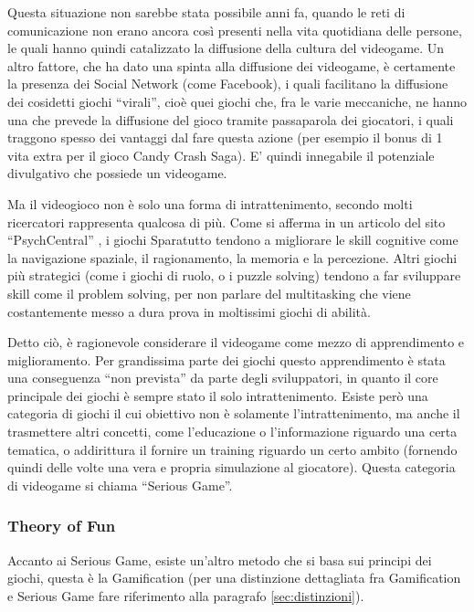 Questa situazione non sarebbe stata possibile anni fa, quando le reti di comunicazione non erano ancora così presenti nella vita quotidiana delle persone, le quali hanno quindi catalizzato la diffusione della cultura del videogame. Un altro fattore, che ha dato una spinta alla diffusione dei videogame, è certamente la presenza dei Social Network (come Facebook), i quali facilitano la diffusione dei cosidetti giochi ``virali'', cioè quei giochi che, fra le varie meccaniche, ne hanno una che prevede la diffusione del gioco tramite passaparola dei giocatori, i quali traggono spesso dei vantaggi dal fare questa azione (per esempio il bonus di 1 vita extra per il gioco Candy Crash Saga). E' quindi innegabile il potenziale divulgativo che possiede un videogame.

Ma il videogioco non è solo una forma di intrattenimento, secondo molti ricercatori rappresenta qualcosa di più.
Come si afferma in un articolo del sito ``PsychCentral'' \cite{phychcentral}, i giochi Sparatutto tendono a migliorare le skill cognitive come la navigazione spaziale, il ragionamento, la memoria e la percezione. 
Altri giochi più strategici (come i giochi di ruolo, o i puzzle solving) tendono a far sviluppare skill come il problem solving, per non parlare del multitasking che viene costantemente messo a dura prova in moltissimi giochi di abilità.


Detto ciò, è ragionevole considerare il videogame come mezzo di apprendimento e miglioramento. Per grandissima parte dei giochi questo apprendimento è stata una conseguenza ``non prevista'' da parte degli sviluppatori, 
in quanto il core principale dei giochi è sempre stato il solo intrattenimento. Esiste però una categoria di giochi il cui obiettivo non è solamente l'intrattenimento, ma anche il trasmettere altri concetti, come l'educazione o l'informazione riguardo una certa tematica, o addirittura il fornire un training riguardo un certo ambito (fornendo quindi delle volte una vera e propria simulazione al giocatore). Questa categoria di videogame si chiama ``Serious Game''.

\subsubsection{Theory of Fun}

Accanto ai Serious Game, esiste un'altro metodo che si basa sui principi dei giochi, questa è la Gamification (per una distinzione dettagliata fra Gamification e Serious Game fare riferimento alla paragrafo \ref{sec:distinzioni}).

